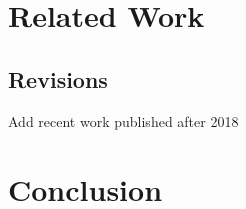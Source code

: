\documentclass[global,twocolumn]{svjour}
\begin{document}
\section{Related Work}
\label{sec:related-work}


\subsection{Revisions}
\begin{compactitem}
  \item Add recent work published after 2018
\end{compactitem}

\section{Conclusion}
\label{sec:conclusion}


\clearpage



%  

% 
\end{document}
